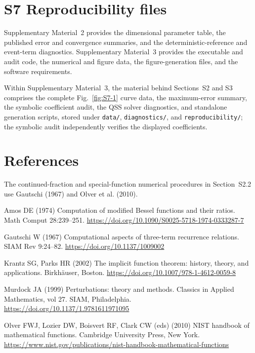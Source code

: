 \documentclass[11pt]{article}
\begin{document}
\section*{S7 Reproducibility files}
Supplementary Material~2 provides the dimensional parameter table, the published error and convergence summaries, and the deterministic-reference and event-term diagnostics. Supplementary Material~3 provides the executable and audit code, the numerical and figure data, the figure-generation files, and the software requirements.

Within Supplementary Material~3, the material behind Sections~S2 and S3 comprises the complete Fig.~\ref{fig:S7-1} curve data, the maximum-error summary, the symbolic coefficient audit, the QSS solver diagnostics, and standalone generation scripts, stored under \texttt{data/}, \texttt{diagnostics/}, and \texttt{reproducibility/}; the symbolic audit independently verifies the displayed coefficients.

\section*{References}

The continued-fraction and special-function numerical procedures in Section~S2.2 use Gautschi (1967) and Olver et al. (2010).

\begin{list}{}{\setlength{\leftmargin}{1.2em}\setlength{\itemindent}{-1.2em}\setlength{\itemsep}{0.4em}}
\item Amos DE (1974) Computation of modified Bessel functions and their ratios. Math Comput 28:239--251. \url{https://doi.org/10.1090/S0025-5718-1974-0333287-7}
\item Gautschi W (1967) Computational aspects of three-term recurrence relations. SIAM Rev 9:24--82. \url{https://doi.org/10.1137/1009002}
\item Krantz SG, Parks HR (2002) The implicit function theorem: history, theory, and applications. Birkhäuser, Boston. \url{https://doi.org/10.1007/978-1-4612-0059-8}
\item Murdock JA (1999) Perturbations: theory and methods. Classics in Applied Mathematics, vol 27. SIAM, Philadelphia. \url{https://doi.org/10.1137/1.9781611971095}
\item Olver FWJ, Lozier DW, Boisvert RF, Clark CW (eds) (2010) NIST handbook of mathematical functions. Cambridge University Press, New York. \url{https://www.nist.gov/publications/nist-handbook-mathematical-functions}
\end{list}
\end{document}
